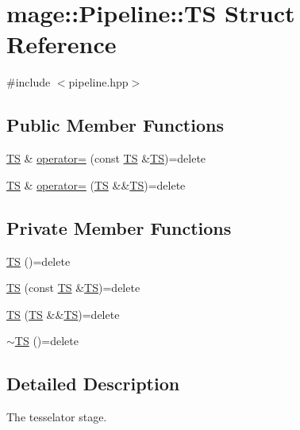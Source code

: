 \hypertarget{structmage_1_1_pipeline_1_1_t_s}{}\section{mage\+:\+:Pipeline\+:\+:TS Struct Reference}
\label{structmage_1_1_pipeline_1_1_t_s}


{\ttfamily \#include $<$pipeline.\+hpp$>$}

\subsection*{Public Member Functions}
\begin{DoxyCompactItemize}
\item 
\hyperlink{structmage_1_1_pipeline_1_1_t_s}{TS} \& \hyperlink{structmage_1_1_pipeline_1_1_t_s_a89d18146d3e5b0cf716c6c3c62c08ca3}{operator=} (const \hyperlink{structmage_1_1_pipeline_1_1_t_s}{TS} \&\hyperlink{structmage_1_1_pipeline_1_1_t_s}{TS})=delete
\item 
\hyperlink{structmage_1_1_pipeline_1_1_t_s}{TS} \& \hyperlink{structmage_1_1_pipeline_1_1_t_s_a5a5c057dd5ae41d5b786862287952a1e}{operator=} (\hyperlink{structmage_1_1_pipeline_1_1_t_s}{TS} \&\&\hyperlink{structmage_1_1_pipeline_1_1_t_s}{TS})=delete
\end{DoxyCompactItemize}
\subsection*{Private Member Functions}
\begin{DoxyCompactItemize}
\item 
\hyperlink{structmage_1_1_pipeline_1_1_t_s_a85d4e04cad3715355e0560f363f65178}{TS} ()=delete
\item 
\hyperlink{structmage_1_1_pipeline_1_1_t_s_a92eaf54232ceb3a714d62de127ca6877}{TS} (const \hyperlink{structmage_1_1_pipeline_1_1_t_s}{TS} \&\hyperlink{structmage_1_1_pipeline_1_1_t_s}{TS})=delete
\item 
\hyperlink{structmage_1_1_pipeline_1_1_t_s_a721b9fbad9dd9df243bab5c658e196df}{TS} (\hyperlink{structmage_1_1_pipeline_1_1_t_s}{TS} \&\&\hyperlink{structmage_1_1_pipeline_1_1_t_s}{TS})=delete
\item 
\hyperlink{structmage_1_1_pipeline_1_1_t_s_a433a622e699a4e0326d2f233f0b16088}{$\sim$\+TS} ()=delete
\end{DoxyCompactItemize}


\subsection{Detailed Description}
The tesselator stage. 

